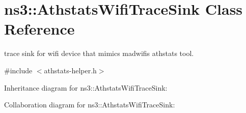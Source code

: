 \hypertarget{classns3_1_1AthstatsWifiTraceSink}{}\section{ns3\+:\+:Athstats\+Wifi\+Trace\+Sink Class Reference}
\label{classns3_1_1AthstatsWifiTraceSink}


trace sink for wifi device that mimics madwifi\textquotesingle{}s athstats tool.  




{\ttfamily \#include $<$athstats-\/helper.\+h$>$}



Inheritance diagram for ns3\+:\+:Athstats\+Wifi\+Trace\+Sink\+:


Collaboration diagram for ns3\+:\+:Athstats\+Wifi\+Trace\+Sink\+:

